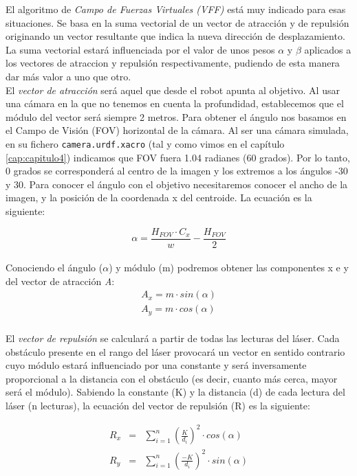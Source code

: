 El algoritmo de \textit{Campo de Fuerzas Virtuales (VFF)} está muy indicado para esas situaciones. Se basa en la suma vectorial de un vector de atracción y de repulsión originando un vector resultante que indica la nueva dirección de desplazamiento. La suma vectorial estará influenciada por el valor de unos pesos $\alpha$ y $\beta$ aplicados a los vectores de atraccion y repulsión respectivamente, pudiendo de esta manera dar más valor a uno que otro.\\

El \textit{vector de atracción} será aquel que desde el robot apunta al objetivo. Al usar una cámara en la que no tenemos en cuenta la profundidad, establecemos que el módulo del vector será siempre 2 metros. Para obtener el ángulo nos basamos en el Campo de Visión (FOV) horizontal de la cámara. Al ser una cámara simulada, en su fichero \texttt{camera.urdf.xacro} (tal y como vimos en el capítulo \ref{cap:capitulo4}) indicamos que FOV fuera 1.04 radianes (60 grados). Por lo tanto, 0 grados se corresponderá al centro de la imagen y los extremos a los ángulos -30 y 30. Para conocer el ángulo con el objetivo necesitaremos conocer el ancho de la imagen, y la posición de la coordenada x del centroide. La ecuación es la siguiente:

\begin{equation*}
\alpha = \frac{H_{FOV} \cdot C_{x}}{w} - \frac{H_{FOV}}{2}
\end{equation*}\\

Conociendo el ángulo ($\alpha$) y módulo (m) podremos obtener las componentes x e y del vector de atracción \textit{A}:
\begin{eqnarray*}
A_x = m \cdot sin(\alpha)\\
A_y = m \cdot cos(\alpha)\\
\end{eqnarray*}

El \textit{vector de repulsión} se calculará a partir de todas las lecturas del láser. Cada obstáculo presente en el rango del láser provocará un vector en sentido contrario cuyo módulo estará influenciado por una constante y será inversamente proporcional a la distancia con el obstáculo (es decir, cuanto más cerca, mayor será el módulo). Sabiendo la constante (K) y la distancia (d) de cada lectura del láser (n lecturas), la ecuación del vector de repulsión (R) es la siguiente:

\begin{eqnarray*}
R_x &=& \sum_{i=1}^n\left(\frac{K}{d_i}\right)^2 \cdot cos(\alpha)\\
R_y &=& \sum_{i=1}^n\left(\frac{-K}{d_i}\right)^2 \cdot sin(\alpha)\\
\end{eqnarray*}

